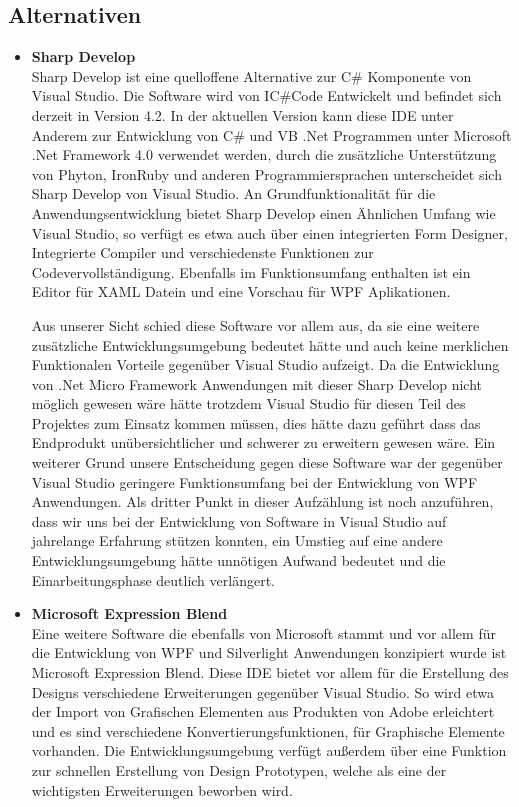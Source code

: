 \subsection{Alternativen}
\begin{itemize}
\item \textbf{Sharp Develop}\\
Sharp Develop ist eine quelloffene Alternative zur C\# Komponente von Visual Studio. Die Software wird von IC\#Code Entwickelt und befindet sich derzeit in Version 4.2.
In der aktuellen Version kann diese IDE unter Anderem zur Entwicklung von C\# und VB .Net Programmen unter Microsoft .Net Framework 4.0 verwendet werden, durch die zusätzliche Unterstützung von Phyton, IronRuby und anderen Programmiersprachen unterscheidet sich Sharp Develop von Visual Studio.
An Grundfunktionalität für die Anwendungsentwicklung bietet Sharp Develop einen Ähnlichen Umfang wie Visual Studio, so verfügt es etwa auch über einen integrierten Form Designer, Integrierte Compiler und verschiedenste Funktionen zur Codevervollständigung. Ebenfalls im Funktionsumfang enthalten ist ein Editor für XAML Datein und eine Vorschau für WPF Aplikationen.

Aus unserer Sicht schied diese Software vor allem aus, da sie eine weitere zusätzliche Entwicklungsumgebung bedeutet hätte und auch keine merklichen Funktionalen Vorteile gegenüber Visual Studio aufzeigt.
Da die Entwicklung von .Net Micro Framework Anwendungen mit dieser Sharp Develop nicht möglich gewesen wäre hätte trotzdem Visual Studio für diesen Teil des Projektes zum Einsatz kommen müssen, dies hätte dazu geführt dass das Endprodukt unübersichtlicher und schwerer zu erweitern gewesen wäre.
Ein weiterer Grund unsere Entscheidung gegen diese Software war der gegenüber Visual Studio geringere Funktionsumfang bei der Entwicklung von WPF Anwendungen.
Als dritter Punkt in dieser Aufzählung ist noch anzuführen, dass wir uns bei der Entwicklung von Software in Visual Studio auf jahrelange Erfahrung stützen konnten, ein Umstieg auf eine andere Entwicklungsumgebung hätte unnötigen Aufwand bedeutet und die Einarbeitungsphase deutlich verlängert.
\item \textbf{Microsoft Expression Blend}\\
Eine weitere Software die ebenfalls von Microsoft stammt und vor allem für die Entwicklung von WPF und Silverlight Anwendungen konzipiert wurde ist Microsoft Expression Blend. Diese IDE bietet vor allem für die Erstellung des Designs verschiedene Erweiterungen gegenüber Visual Studio. So wird etwa der Import von Grafischen Elementen aus Produkten von Adobe erleichtert und es sind verschiedene Konvertierungsfunktionen, für Graphische Elemente vorhanden. Die Entwicklungsumgebung verfügt außerdem über eine Funktion zur schnellen Erstellung von Design Prototypen, welche als eine der wichtigsten Erweiterungen beworben wird.


\end{itemize}
